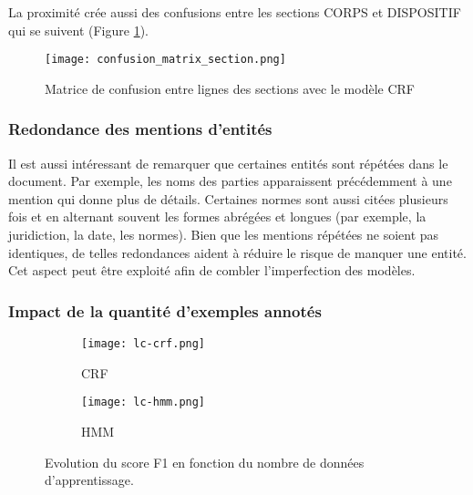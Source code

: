  La proximité crée aussi des confusions entre les sections CORPS et DISPOSITIF qui se suivent (Figure \ref{fig:structuration:matrice-confusion-section}). 

\begin{figure}[!ht]
	\centering
	\texttt{[image: confusion\_matrix\_section.png]}
	\caption{Matrice de confusion entre lignes des sections avec le modèle CRF}
	\label{fig:structuration:matrice-confusion-section}
\end{figure}

\subsubsection{Redondance des mentions d'entités}
Il est aussi intéressant de remarquer que certaines entités sont répétées dans le document. Par exemple, les noms des parties apparaissent précédemment à une mention qui donne plus de détails. Certaines normes sont aussi citées plusieurs fois et en alternant souvent les formes abrégées et longues (par exemple, la juridiction, la date, les normes). Bien que les mentions répétées ne soient pas identiques, de telles redondances aident à réduire le risque de manquer une entité. %
Cet aspect peut être exploité afin de combler l'imperfection des modèles.


\subsubsection{Impact de la quantité d'exemples annotés}

\begin{figure}[ht]
	\centering
	\begin{subfigure}[ht]{0.95\textwidth}
		\centering
		\texttt{[image: lc-crf.png]} 
		\caption{CRF} \label{fig:structuration:learning-curves-crf}
	\end{subfigure} 
	
	\begin{subfigure}[ht]{0.95\textwidth}
		\centering
		\texttt{[image: lc-hmm.png]}
		\caption{HMM} \label{fig:structuration:learning-curves-hmm}
	\end{subfigure}
	\caption{Evolution du score F1 en fonction du nombre de données d'apprentissage.} \label{fig:structuration:learning-curves}
\end{figure}

